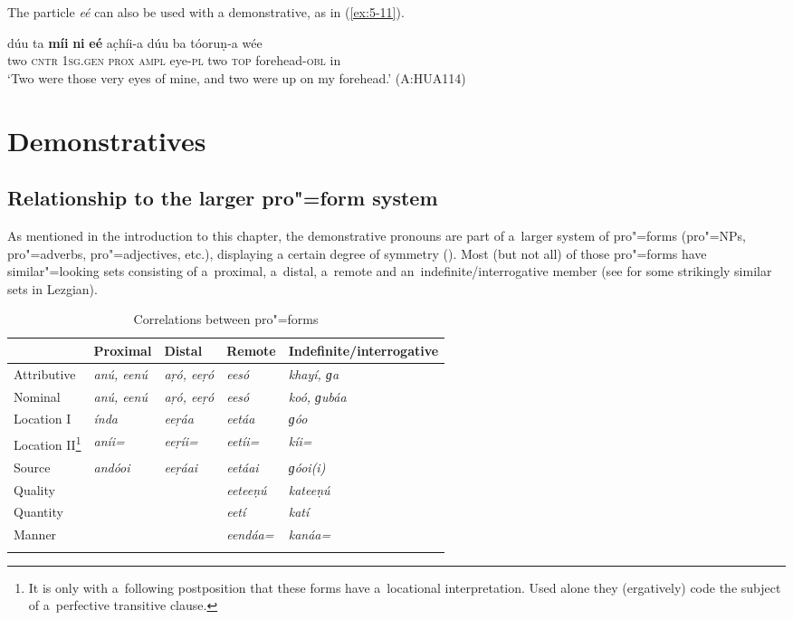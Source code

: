 The particle \textit{eé} can also be used with  a demonstrative, as in (\ref{ex:5-11}). 


\begin{exe}
\ex
\label{ex:5-11}
\gll dúu ta \textbf{míi} \textbf{ni} \textbf{eé} ac̣híi-a dúu ba tóoruṇ-a wée \\
	two \textsc{cntr} \textsc{1sg.gen} \textsc{prox} \textsc{ampl} eye-\textsc{pl} two \textsc{top} forehead-\textsc{obl} in \\
\glt `Two were those very eyes of mine, and two were up on my forehead.' (A:HUA114) 
\end{exe}

\section{Demonstratives}
\label{sec:5-3}

\subsection{Relationship to the larger pro"=form system}
\label{subsec:5-2-1}


As mentioned in the introduction to this chapter, the demonstrative pronouns are part of a~larger system of pro"=forms (pro"=NPs, pro"=adverbs, pro"=adjectives, etc.), displaying a certain degree of symmetry (). Most (but not all) of those pro"=forms have similar"=looking sets consisting of a~proximal, a~distal, a~remote and an~indefinite/interrogative member (see \citealt[187--188]{haspelmath1993} for some strikingly similar sets in Lezgian).



\begin{table}[ht]
\caption{Correlations between pro"=forms}
\begin{tabularx}{\textwidth}{ Q Q Q Q Q }
\lsptoprule
&
Proximal
&
Distal
&
Remote
&
Indefinite/{\allowbreak}interrogative\\\midrule
Attributive &
\textit{anú, eenú} &
\textit{aṛó, eeṛó} &
\textit{eesó} &
\textit{khayí, ɡa} \\
Nominal &
\textit{anú, eenú} &
\textit{aṛó, eeṛó} &
\textit{eesó} &
\textit{koó, ɡubáa} \\
Location I &
\textit{índa} &
\textit{eeṛáa} &
\textit{eetáa} &
\textit{ɡóo} \\
Location II\footnote{It is only with a~following postposition that these forms have a~locational interpretation. Used alone they (ergatively) code the subject of a~perfective transitive clause.} &
\textit{aníi=} &
\textit{eeṛíi=} &
\textit{eetíi=} &
\textit{kíi=} \\
Source &
\textit{andóoi} &
\textit{eeṛáai} &
\textit{eetáai} &
\textit{ɡóoi(i)} \\
Quality &
&
&
\textit{eeteeṇú} &
\textit{kateeṇú} \\
Quantity &
&
&
\textit{eetí} &
\textit{katí} \\
Manner &
&
&
\textit{eendáa=} &
\textit{kanáa=} \\\lspbottomrule
\end{tabularx}
\label{tab:5-2}
\end{table}

